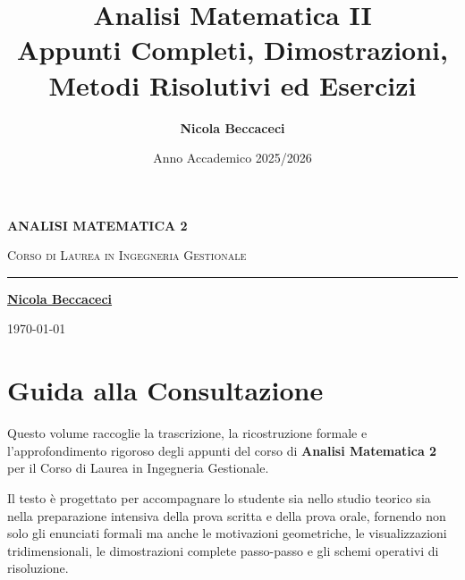\documentclass[11pt,a4paper,twoside,openright]{book}
\title{\Huge\textbf{\textsf{Analisi Matematica II}}\\[0.5em]
\Large\textsf{Appunti Completi, Dimostrazioni, Metodi Risolutivi ed Esercizi}}
\author{\textbf{\textsf{Nicola Beccaceci}}}
\date{\textsf{Anno Accademico 2025/2026}}
\begin{document}
\frontmatter
\begin{titlepage}
    \centering
    \vspace*{2cm}
    {\Huge\bfseries\color{navyblue} ANALISI MATEMATICA 2\par}
    \vspace{1cm}
    {\Large\scshape Corso di Laurea in Ingegneria Gestionale\par}
    \vfill
    \rule{0.6\textwidth}{1pt}\par
    \vspace{1cm}
    {\large\textbf{\underline{Nicola Beccaceci}}\par}
    \vspace{0.5cm}
    {\small \today\par}
    \vspace*{2cm}
\end{titlepage}

\tableofcontents
\cleardoublepage

\chapter*{Guida alla Consultazione}
Questo volume raccoglie la trascrizione, la ricostruzione formale e l'approfondimento rigoroso degli appunti del corso di \textbf{Analisi Matematica 2} per il Corso di Laurea in Ingegneria Gestionale.

Il testo è progettato per accompagnare lo studente sia nello studio teorico sia nella preparazione intensiva della prova scritta e della prova orale, fornendo non solo gli enunciati formali ma anche le motivazioni geometriche, le visualizzazioni tridimensionali, le dimostrazioni complete passo-passo e gli schemi operativi di risoluzione.
\end{document}

